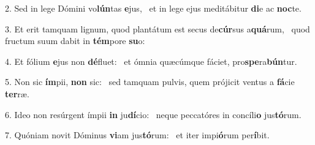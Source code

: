 2. Sed in lege Dómini vo\textbf{lún}tas \textbf{e}jus, \ast\  et in lege ejus meditábitur \textbf{di}e ac \textbf{noc}te.\

3. Et erit tamquam lignum, quod plantátum est secus de\textbf{cúr}sus a\textbf{quá}rum, \ast\  quod fructum suum dabit in \textbf{tém}pore \textbf{su}o:\

4. Et fólium \textbf{e}jus non \textbf{dé}fluet: \ast\  et ómnia quæcúmque fáciet, pro\textbf{spe}ra\textbf{bún}tur.\

5. Non sic \textbf{ím}pii, \textbf{non} sic: \ast\  sed tamquam pulvis, quem prójicit ventus a \textbf{fá}cie \textbf{ter}ræ.\

6. Ideo non resúrgent ímpii \textbf{in} ju\textbf{dí}cio: \ast\  neque peccatóres in concíli\textbf{o} jus\textbf{tó}rum.\

7. Quóniam novit Dóminus \textbf{vi}am jus\textbf{tó}rum: \ast\  et iter impi\textbf{ó}rum per\textbf{í}bit.\

